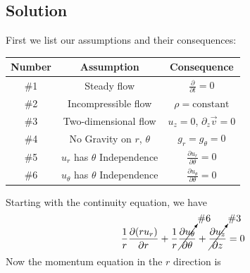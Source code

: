 \subsection*{Solution}
First we list our assumptions and their consequences:
\begin{table}[h]
    \centering
    \begin{tabular}{ccc}
        \toprule
        Number & Assumption & Consequence \\
        \hline
        \#1 & Steady flow & $\frac{\partial}{\partial t} = 0$ \\
        \#2 & Incompressible flow & $\rho = \text{constant}$ \\
        \#3 & Two-dimensional flow & $u_z = 0$, $\partial_z \vec{v} = 0$ \\
        \#4 & No Gravity on $r$, $\theta$ & $g_r = g_{\theta} = 0$ \\
        \#5 & $u_r$ has $\theta$ Independence & $\frac{\partial u_r}{\partial \theta} = 0$ \\
        \#6 & $u_{\theta}$ has $\theta$ Independence & $\frac{\partial u_{\theta}}{\partial \theta} = 0$ \\
        \bottomrule
    \end{tabular}
\end{table}
Starting with the continuity equation, we have
\begin{align*}
    \frac{1}{r} \frac{\partial (r u_r)}{\partial r} + \frac{1}{r} \cancelto{\text{\#6}}{\frac{\partial u_{\theta}}{\partial \theta}} + \cancelto{\text{\#3}}{\frac{\partial u_z}{\partial z}} = 0
\end{align*}
Now the momentum equation in the $r$ direction is
